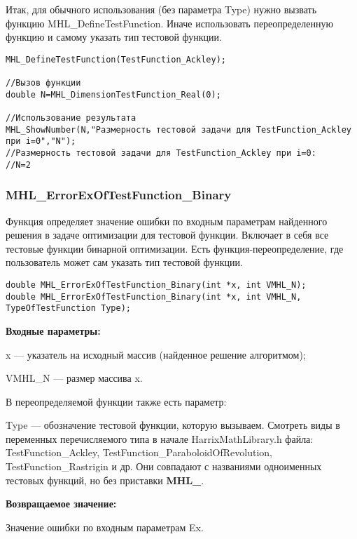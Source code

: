 \documentclass[a4paper,12pt]{article}
\begin{document}
Итак, для обычного использования (без параметра Type) нужно вызвать функцию MHL\_DefineTestFunction. Иначе использовать переопределенную функцию и самому указать тип тестовой функции.


\begin{lstlisting}[label=code_use_MHL_DimensionTestFunction_Real,caption=Пример использования]
MHL_DefineTestFunction(TestFunction_Ackley);

//Вызов функции
double N=MHL_DimensionTestFunction_Real(0);

//Использование результата
MHL_ShowNumber(N,"Размерность тестовой задачи для TestFunction_Ackley при i=0","N");
//Размерность тестовой задачи для TestFunction_Ackley при i=0:
//N=2
\end{lstlisting}

\subsubsection{MHL\_ErrorExOfTestFunction\_Binary}\label{MHL_ErrorExOfTestFunction_Binary}

Функция определяет значение ошибки по входным параметрам найденного решения в задаче оптимизации для тестовой функции. Включает в себя все тестовые функции бинарной оптимизации. Есть функция-переопределение, где пользователь может сам указать тип тестовой функции.


\begin{lstlisting}[label=code_syntax_MHL_ErrorExOfTestFunction_Binary,caption=Синтаксис]
double MHL_ErrorExOfTestFunction_Binary(int *x, int VMHL_N);
double MHL_ErrorExOfTestFunction_Binary(int *x, int VMHL_N, TypeOfTestFunction Type);
\end{lstlisting}

\textbf{Входные параметры:}

x --- указатель на исходный массив (найденное решение алгоритмом);

VMHL\_N --- размер массива x.

В переопределяемой функции также есть параметр:
  
Type --- обозначение тестовой функции, которую вызываем.
Смотреть виды в переменных перечисляемого типа в начале HarrixMathLibrary.h файла: TestFunction\_Ackley, TestFunction\_ParaboloidOfRevolution, TestFunction\_Rastrigin и др. Они совпадают с названиями одноименных тестовых функций, но без приставки \textbf{MHL\_}.

\textbf{Возвращаемое значение:}
 
Значение ошибки по входным параметрам Ex.
\end{document}
